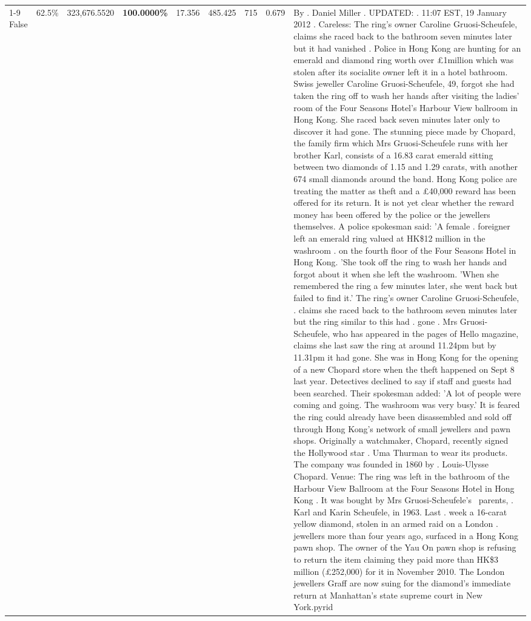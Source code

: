 \begin{table}[H]
\begin{tabular}{lllrlllll}
\cline{1-9}
False & 62.5\% & 323,676.5520 & \bfseries \color{red} 100.0000\% & 17.356 & 485.425 & 715 & 0.679 & By . Daniel Miller . UPDATED: . 11:07 EST, 19 January 2012 . Careless: The ring's owner Caroline Gruosi-Scheufele, claims she raced back to the bathroom seven minutes later but it had vanished . Police in Hong Kong are hunting for an emerald and diamond ring worth over £1million which was stolen after its socialite owner left it in a hotel bathroom. Swiss jeweller Caroline Gruosi-Scheufele, 49, forgot she had taken the ring off to wash her hands after visiting the ladies' room of the Four Seasons Hotel's Harbour View ballroom in Hong Kong. She raced back seven minutes later only to discover it had gone. The stunning piece made by Chopard, the family firm which Mrs Gruosi-Scheufele runs with her brother Karl, consists of a 16.83 carat emerald sitting between two diamonds of 1.15 and 1.29 carats, with another 674 small diamonds around the band. Hong Kong police are treating the matter as theft and a £40,000 reward has been offered for its return. It is not yet clear whether the reward money has been offered by the police or the jewellers themselves. A police spokesman said: 'A female . foreigner left an emerald ring valued at HK\$12 million in the washroom . on the fourth floor of the Four Seasons Hotel in Hong Kong. 'She took off the ring to wash her hands and forgot about it when she left the washroom. 'When she remembered the ring a few minutes later, she went back but failed to find it.' The ring's owner Caroline Gruosi-Scheufele, . claims she raced back to the bathroom seven minutes later but the ring similar to this had . gone . Mrs Gruosi-Scheufele, who has appeared in the pages of Hello magazine, claims she last saw the ring at around 11.24pm but by 11.31pm it had gone. She was in Hong Kong for the opening of a new Chopard store when the theft happened on Sept 8 last year. Detectives declined to say if staff and guests had been searched. Their spokesman added: 'A lot of people were coming and going. The washroom was very busy.' It is feared the ring could already have been disassembled and sold off through Hong Kong's network of small jewellers and pawn shops. Originally a watchmaker, Chopard, recently signed the Hollywood star . Uma Thurman to wear its products. The company was founded in 1860 by . Louis-Ulysse Chopard. Venue: The ring was left in the bathroom of the Harbour View Ballroom at the Four Seasons Hotel in Hong Kong . It was bought by Mrs Gruosi-Scheufele's  parents, . Karl and Karin Scheufele, in 1963. Last . week a 16-carat yellow diamond, stolen in an armed raid on a London . jewellers more than four years ago, surfaced in a Hong Kong pawn shop. The owner of the Yau On pawn shop is refusing to return the item claiming they paid more than HK\$3 million (£252,000) for it in November 2010. The London jewellers Graff are now suing for the diamond’s immediate return at Manhattan’s state supreme court in New York.pyrid \\

\end{tabular}
\end{table}
